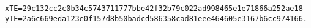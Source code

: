 \begin{verbatim}
xTE=29c132cc2c0b34c5743711777bbe42f32b79c022ad998465e1e71866a252ae18
yTE=2a6c669eda123e0f157d8b50badcd586358cad81eee464605e3167b6cc974166.
\end{verbatim}
